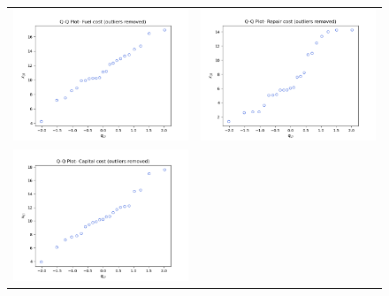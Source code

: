 \begin{enumerate}[label= (\alph*)]
    \begin{figure}[H]
        \centering
        \begin{tabular}{cc}
            \includegraphics[scale=0.30]{./python/chapter-5/Question-5-22-a-QQ-Fuel-del.png} &
            \includegraphics[scale=0.30]{./python/chapter-5/Question-5-22-a-QQ-Repair-del.png} \\
            \includegraphics[scale=0.30]{./python/chapter-5/Question-5-22-a-QQ-Capital-del.png}

\end{tabular}
\end{figure}
\end{enumerate}
